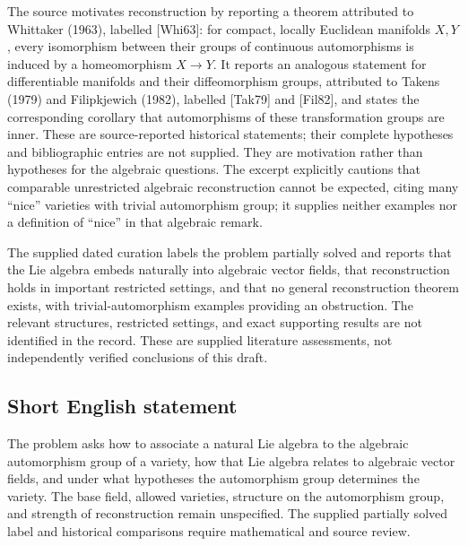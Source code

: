 \documentclass[11pt]{article}
\begin{document}
The source motivates reconstruction by reporting a theorem attributed to Whittaker (1963), labelled [Whi63]: for compact, locally Euclidean manifolds \(X,Y\), every isomorphism between their groups of continuous automorphisms is induced by a homeomorphism \(X\to Y\). It reports an analogous statement for differentiable manifolds and their diffeomorphism groups, attributed to Takens (1979) and Filipkjewich (1982), labelled [Tak79] and [Fil82], and states the corresponding corollary that automorphisms of these transformation groups are inner. These are source-reported historical statements; their complete hypotheses and bibliographic entries are not supplied. They are motivation rather than hypotheses for the algebraic questions. The excerpt explicitly cautions that comparable unrestricted algebraic reconstruction cannot be expected, citing many ``nice'' varieties with trivial automorphism group; it supplies neither examples nor a definition of ``nice'' in that algebraic remark.

The supplied dated curation labels the problem partially solved and reports that the Lie algebra embeds naturally into algebraic vector fields, that reconstruction holds in important restricted settings, and that no general reconstruction theorem exists, with trivial-automorphism examples providing an obstruction. The relevant structures, restricted settings, and exact supporting results are not identified in the record. These are supplied literature assessments, not independently verified conclusions of this draft.
\subsection{Short English statement}
The problem asks how to associate a natural Lie algebra to the algebraic automorphism group of a variety, how that Lie algebra relates to algebraic vector fields, and under what hypotheses the automorphism group determines the variety. The base field, allowed varieties, structure on the automorphism group, and strength of reconstruction remain unspecified. The supplied partially solved label and historical comparisons require mathematical and source review.
\end{document}
